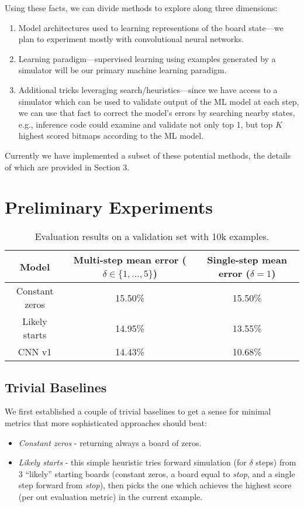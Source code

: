 \documentclass[conference]{IEEEtran}
\begin{document}
Using these facts, we can divide methods to explore along three dimensions:

\begin{enumerate}
    \item Model architectures used to learning representions of the board state---we plan to experiment mostly with convolutional neural networks.
    
    \item Learning paradigm---supervised learning using examples generated by a simulator will be our primary machine learning paradigm.
    
    \item Additional tricks leveraging search/heuristics---since we have access to a simulator which can be used to validate output of the ML model at each step, we can use that fact to correct the model's errors by searching nearby states, e.g., inference code could examine and validate not only top 1, but top $K$ highest scored bitmaps according to the ML model. 
    
\end{enumerate}
Currently we have implemented a subset of these potential methods, the details of which are provided in Section 3.

\section{Preliminary Experiments}

\begin{table*}[t]
    \centering
    \begin{tabular}{|c|c|c|}
    \hline
    Model & Multi-step mean error ($\delta \in \{1,\dots,5\}$)  & Single-step mean error ($\delta = 1$) \\
    \hline
    Constant zeros & 15.50\% & 15.50\% \\
    Likely starts & 14.95\% & 13.55\% \\
    CNN v1 & 14.43\% & 10.68\% \\
    \hline
    \end{tabular}
    \caption{Evaluation results on a validation set with 10k examples.}
    \label{tab:eval_results}
\end{table*}

\subsection{Trivial Baselines}
We first established a couple of trivial baselines to get a sense for minimal metrics that more sophisticated approaches should beat:
\begin{itemize}
    \item {\it Constant zeros} - returning always a board of zeros.
    \item {\it Likely starts} - this simple heuristic tries forward simulation (for $\delta$ steps) from $3$ ``likely'' starting boards (constant zeros, a board equal to {\it stop}, and a single step forward from {\it stop}), then picks the one which achieves the highest score (per out evaluation metric) in the current example.
\end{itemize}
\end{document}
